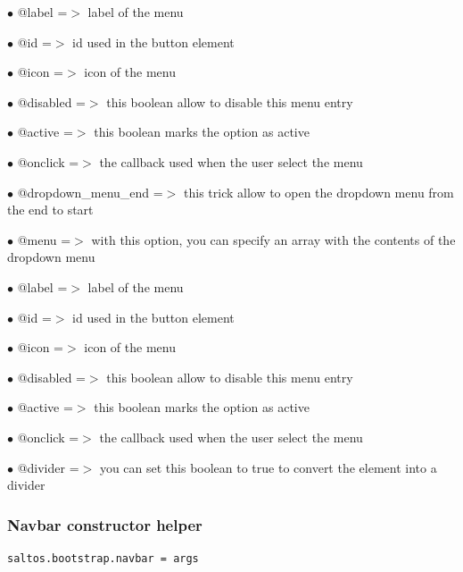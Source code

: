 \documentclass[a4paper]{article}
\begin{document}
\begin{compactitem}
\item[\color{myblue}$\bullet$] @label             =$>$ label of the menu
\item[\color{myblue}$\bullet$] @id                =$>$ id used in the button element
\item[\color{myblue}$\bullet$] @icon              =$>$ icon of the menu
\item[\color{myblue}$\bullet$] @disabled          =$>$ this boolean allow to disable this menu entry
\item[\color{myblue}$\bullet$] @active            =$>$ this boolean marks the option as active
\item[\color{myblue}$\bullet$] @onclick           =$>$ the callback used when the user select the menu
\item[\color{myblue}$\bullet$] @dropdown\_menu\_end =$>$ this trick allow to open the dropdown menu from the end to start
\item[\color{myblue}$\bullet$] @menu              =$>$ with this option, you can specify an array with the contents of the dropdown menu
\end{compactitem}

\begin{compactitem}
\item[\color{myblue}$\bullet$] @label    =$>$ label of the menu
\item[\color{myblue}$\bullet$] @id       =$>$ id used in the button element
\item[\color{myblue}$\bullet$] @icon     =$>$ icon of the menu
\item[\color{myblue}$\bullet$] @disabled =$>$ this boolean allow to disable this menu entry
\item[\color{myblue}$\bullet$] @active   =$>$ this boolean marks the option as active
\item[\color{myblue}$\bullet$] @onclick  =$>$ the callback used when the user select the menu
\item[\color{myblue}$\bullet$] @divider  =$>$ you can set this boolean to true to convert the element into a divider
\end{compactitem}

\hypertarget{toc103}{}
\subsubsection{Navbar constructor helper}

\begin{lstlisting}
saltos.bootstrap.navbar = args
\end{lstlisting}
\end{document}
